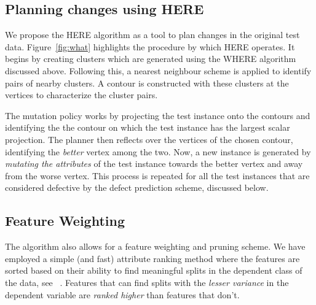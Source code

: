 \documentclass[conference]{IEEEtran}
\begin{document}
\subsection{Planning changes using HERE}
We propose the HERE algorithm as a tool to plan changes in the original test data. Figure~\ref{fig:what} highlights the procedure by which HERE operates. It begins by creating clusters which are generated using the WHERE algorithm discussed above. Following this, a nearest neighbour scheme is applied to identify pairs of nearby clusters. A contour is constructed with these clusters at the vertices to characterize the cluster pairs.

The mutation policy works by projecting the test instance onto the contours and identifying the the contour on which the test instance has the largest scalar projection. The planner then reflects over the vertices of the chosen contour, identifying the \textit{better} vertex among the two. Now, a new instance is generated by \textit{mutating the attributes} of the test instance towards the better vertex and away from the worse vertex. This process is repeated for all the test instances that are considered defective by the defect prediction scheme, discussed below.

\subsection{Feature Weighting} \label{fwt}
The algorithm also allows for a feature weighting and pruning scheme. We have employed a simple (and fast) attribute ranking method where the features are sorted based on their ability to find meaningful splits in the dependent class of the data, see ~\cite{hall03}. Features that can find splits with the \textit{lesser variance} in the dependent variable are \textit{ranked higher} than features that don't. 
\end{document}
